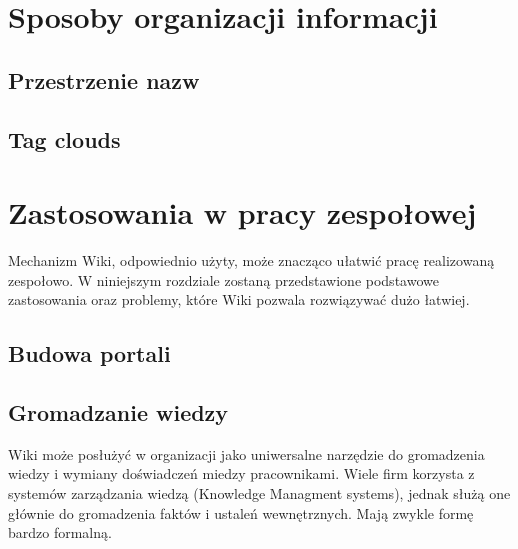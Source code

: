\documentclass{article}
\begin{document}
\newpage
\section{Sposoby organizacji informacji}	
	\subsection{Przestrzenie nazw}
	\subsection{Tag clouds}


	

\newpage
\section{Zastosowania w pracy zespołowej}
Mechanizm Wiki, odpowiednio użyty, może znacząco ułatwić pracę realizowaną zespołowo. W niniejszym rozdziale zostaną przedstawione podstawowe zastosowania oraz problemy, które Wiki pozwala rozwiązywać dużo łatwiej. 
	\subsection{Budowa portali}  




	\subsection{Gromadzanie wiedzy}

		Wiki może posłużyć w organizacji jako uniwersalne narzędzie do gromadzenia wiedzy i wymiany doświadczeń miedzy pracownikami. Wiele firm korzysta z systemów zarządzania wiedzą (Knowledge Managment systems), jednak służą one głównie do gromadzenia faktów i ustaleń wewnętrznych. Mają zwykle formę bardzo formalną.
\end{document}
